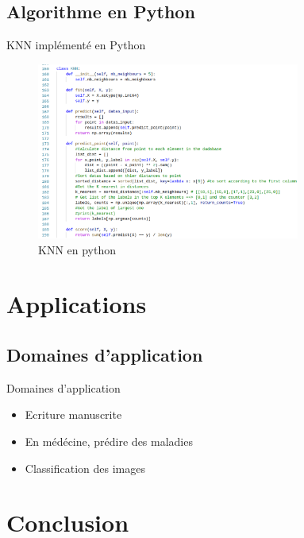 \documentclass{beamer}
\begin{document}
\subsection{Algorithme en Python}
\begin{frame}{KNN implémenté en Python}
\begin{figure}[H]
    \includegraphics[width=\linewidth, height=5.8cm]{images/knn_in_python.png}
    \caption{KNN en python}
    \label{fig:L1}
\end{figure}
\end{frame}

\section{Applications}
\subsection{Domaines d'application}
\begin{frame}{Domaines d'application}
\begin{itemize}
		\item Ecriture manuscrite
		\item En médécine, prédire des maladies
		\item Classification des images
\end{itemize}
\end{frame}

\section{Conclusion}
\end{document}
